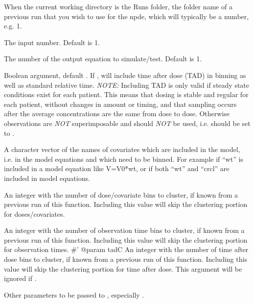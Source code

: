 \documentclass[a4paper]{book}
\begin{document}
\begin{Arguments}
\begin{ldescription}
\item[\code{run}] When the current working directory is the Runs folder, the folder name of a previous run that you wish to use for the npde,
which will typically be a number, e.g. 1.

\item[\code{input}] The input number.  Default is 1.

\item[\code{outeq}] The number of the output equation to simulate/test.  Default is 1.

\item[\code{tad}] Boolean argument, default .  If , will include 
time after dose (TAD) in binning as well as standard relative time.  \emph{NOTE:} Including TAD is only 
valid if steady state conditions exist for each patient.  This means that dosing is stable and regular
for each patient, without changes in amount or timing, and that sampling occurs after the average concentrations
are the same from dose to dose.  Otherwise observations are \emph{NOT} superimposable and  should 
\emph{NOT} be used, i.e. should be set to .

\item[\code{binCov}] A character vector of the names of covariates which are included in the model, i.e. in the
model equations and which need to be binned.  For example  if ``wt'' is included in a
model equation like V=V0*wt, or  if both ``wt'' and ``crcl'' 
are included in model equations.

\item[\code{doseC}] An integer with the number of dose/covariate bins to cluster, if known from a previous run of 
this function.  Including this value will skip the clustering portion for doses/covariates.

\item[\code{timeC}] An integer with the number of observation time bins to cluster, if known from a previous run of 
this function.  Including this value will skip the clustering portion for observation times.
\#' @param tadC An integer with the number of time after dose bins to cluster, if known from a previous run of 
this function.  Including this value will skip the clustering portion for time after dose. This argument
will be ignored if .

\item[\code{...}] Other parameters to be passed to , especially .
\end{ldescription}
\end{Arguments}
\end{document}
